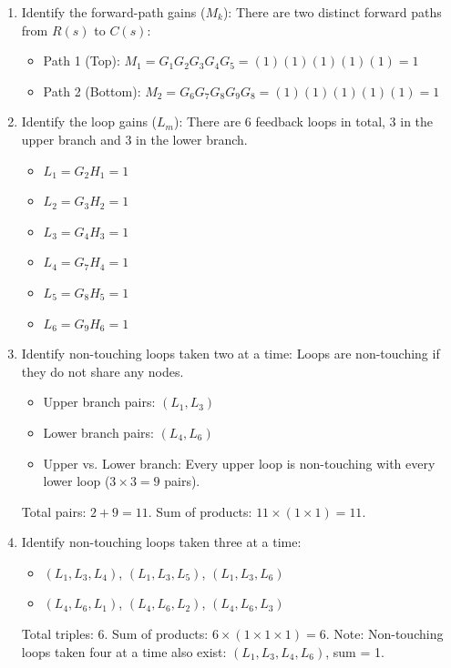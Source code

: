 \documentclass[11pt]{article}
\begin{document}
\begin{enumerate}[label=(\alph*), itemindent=*, leftmargin=*, nolistsep]
    \item Identify the forward-path gains ($M_k$):
    There are two distinct forward paths from $R(s)$ to $C(s)$:
    \begin{itemize}
        \item Path 1 (Top): \( M_1 = G_1 G_2 G_3 G_4 G_5 = (1)(1)(1)(1)(1) = 1 \)
        \item Path 2 (Bottom): \( M_2 = G_6 G_7 G_8 G_9 G_8 = (1)(1)(1)(1)(1) = 1 \)
    \end{itemize}

    \item Identify the loop gains ($L_m$):
    There are 6 feedback loops in total, 3 in the upper branch and 3 in the lower branch.
    \begin{itemize}
        \item \( L_1 = G_2 H_1 = 1 \)
        \item \( L_2 = G_3 H_2 = 1 \)
        \item \( L_3 = G_4 H_3 = 1 \)
        \item \( L_4 = G_7 H_4 = 1 \)
        \item \( L_5 = G_8 H_5 = 1 \)
        \item \( L_6 = G_9 H_6 = 1 \)
    \end{itemize}

    \item Identify non-touching loops taken two at a time:
    Loops are non-touching if they do not share any nodes. 
    \begin{itemize}
        \item Upper branch pairs: \((L_1, L_3)\) 
        \item Lower branch pairs: \((L_4, L_6)\)
        \item Upper vs. Lower branch: Every upper loop is non-touching with every lower loop (\(3 \times 3 = 9\) pairs).
    \end{itemize}
    Total pairs: \( 2 + 9 = 11 \). Sum of products: \( 11 \times (1 \times 1) = 11 \).

    \item Identify non-touching loops taken three at a time:
    \begin{itemize}
        \item \((L_1, L_3, L_4)\), \((L_1, L_3, L_5)\), \((L_1, L_3, L_6)\)
        \item \((L_4, L_6, L_1)\), \((L_4, L_6, L_2)\), \((L_4, L_6, L_3)\)
    \end{itemize}
    Total triples: \( 6 \). Sum of products: \( 6 \times (1 \times 1 \times 1) = 6 \).
    Note: Non-touching loops taken four at a time also exist: \((L_1, L_3, L_4, L_6)\), sum = 1.


\end{enumerate}
\end{document}
